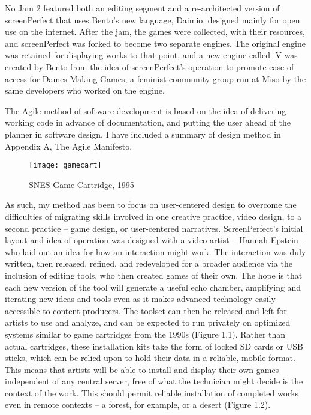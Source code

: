 No Jam 2 featured both an editing segment and a re-architected version of screenPerfect that uses Bento's new language, Daimio, designed mainly for open use on the internet. After the jam, the games were collected, with their resources, and screenPerfect was forked to become two separate engines. The original engine was retained for displaying works to that point, and a new engine called iV was created by Bento from the idea of screenPerfect's operation to promote ease of access for Dames Making Games, a feminist community group run at Miso by the same developers who worked on the engine. 

The Agile method of software development is based on the idea of delivering working code in advance of documentation, and putting the user ahead of the planner in software design. I have included a summary of design method in Appendix A, The Agile Manifesto. 


\begin{figure}[!ht]
\centering
  \texttt{[image: gamecart]}
 \caption{SNES Game Cartridge, 1995}
\end{figure}

As such, my method has been to focus on user-centered design to overcome the difficulties of migrating skills involved in one creative practice, video design, to a second practice – game design, or user-centered narratives. ScreenPerfect's initial layout and idea of operation was designed with a video artist – Hannah Epstein - who laid out an idea for how an interaction might work. The interaction was duly written, then released, refined, and redeveloped for a broader audience via the inclusion of editing tools, who then created games of their own. The hope is that each new version of the tool will generate a useful echo chamber, amplifying and iterating new ideas and tools even as it makes advanced technology easily accessible to content producers.
The toolset can then be released and left for artists to use and analyze, and can be expected to run 
privately on optimized systems similar to game cartridges from the 1990s (Figure 1.1). Rather than actual cartridges, these installation kits take the form of locked SD cards or USB sticks, which can be relied upon to hold their data in a reliable, mobile format. This means that artists will be able to install and display their own games independent of any central server, free of what the technician might decide is the context of the work. This should permit reliable installation of completed works even in remote contexts – a forest, for example, or a desert (Figure 1.2).


